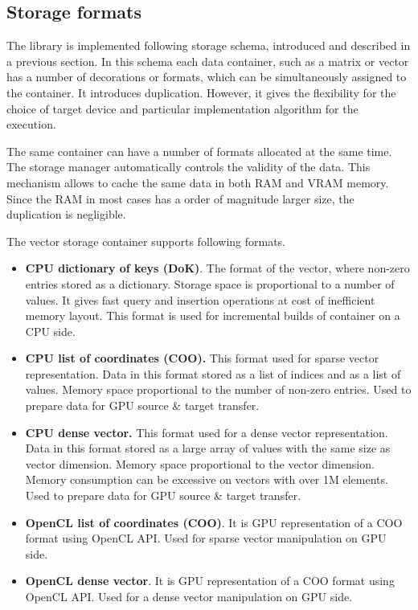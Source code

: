 \subsection{Storage formats}

The library is implemented following storage schema, introduced and described in a previous section. In this schema each data container, such as a matrix or vector has a number of decorations or formats, which can be simultaneously assigned to the container. It introduces duplication. However, it gives the flexibility for the choice of target device and particular implementation algorithm for the execution.

The same container can have a number of formats allocated at the same time. The storage manager automatically controls the validity of the data. This mechanism allows to cache the same data in both RAM and VRAM memory. Since the RAM in most cases has a order of magnitude larger size, the duplication is negligible.

The vector storage container supports following formats.

\begin{itemize}
    \item \textbf{CPU dictionary of keys (DoK)}. The format of the vector, where non-zero entries stored as a dictionary. Storage space is proportional to a number of values. It gives fast query and insertion operations at cost of inefficient memory layout. This format is used for incremental builds of container on a CPU side.
   
    \item \textbf{CPU list of coordinates (COO).} This format used for sparse vector representation. Data in this format stored as a list of indices and as a list of values. Memory space proportional to the number of non-zero entries. Used to prepare data for GPU source \& target transfer.
   
    \item \textbf{CPU dense vector.} This format used for a dense vector representation. Data in this format stored as a large array of values with the same size as vector dimension. Memory space proportional to the vector dimension. Memory consumption can be excessive on vectors with over 1M elements. Used to prepare data for GPU source \& target transfer.
    
    \item \textbf{OpenCL list of coordinates (COO)}. It is GPU representation of a COO format using OpenCL API. Used for sparse vector manipulation on GPU side. 
    
    \item \textbf{OpenCL dense vector}. It is GPU representation of a COO format using OpenCL API. Used for a dense vector manipulation on GPU side.
\end{itemize}

